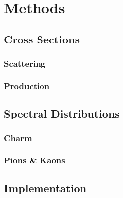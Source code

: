 \chapter{Methods}
\label{ch:methods}

\section{Cross Sections}
\label{sec:cross}



\subsection{Scattering}
\label{sub:scattering}



\subsection{Production}
\label{sub:production}



\section{Spectral Distributions}
\label{sec:spectral}



\subsection{Charm}
\label{sub:charm}



\subsection{Pions \& Kaons}
\label{sub:pions}



\section{Implementation}
\label{sec:implementation}
